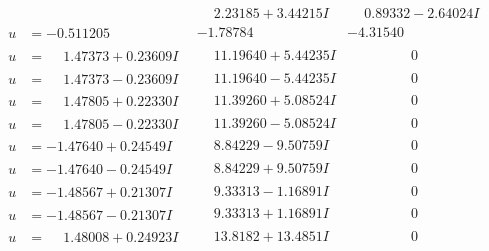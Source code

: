 \documentclass[1p]{elsarticle_modified}
\theoremstyle{definition}
\begin{document}
$$\begin{array}{c|c|c}
 & \phantom{-}2.23185 + 3.44215 I & \phantom{-}0.89332 - 2.64024 I \\ \hline\begin{aligned}
u &= -0.511205\phantom{ +0.000000I}\end{aligned}
 & -1.78784\phantom{ +0.000000I} & -4.31540\phantom{ +0.000000I} \\ \hline\begin{aligned}
u &= \phantom{-}1.47373 + 0.23609 I\end{aligned}
 & \phantom{-}11.19640 + 5.44235 I & \phantom{-0.000000 } 0 \\ \hline\begin{aligned}
u &= \phantom{-}1.47373 - 0.23609 I\end{aligned}
 & \phantom{-}11.19640 - 5.44235 I & \phantom{-0.000000 } 0 \\ \hline\begin{aligned}
u &= \phantom{-}1.47805 + 0.22330 I\end{aligned}
 & \phantom{-}11.39260 + 5.08524 I & \phantom{-0.000000 } 0 \\ \hline\begin{aligned}
u &= \phantom{-}1.47805 - 0.22330 I\end{aligned}
 & \phantom{-}11.39260 - 5.08524 I & \phantom{-0.000000 } 0 \\ \hline\begin{aligned}
u &= -1.47640 + 0.24549 I\end{aligned}
 & \phantom{-}8.84229 - 9.50759 I & \phantom{-0.000000 } 0 \\ \hline\begin{aligned}
u &= -1.47640 - 0.24549 I\end{aligned}
 & \phantom{-}8.84229 + 9.50759 I & \phantom{-0.000000 } 0 \\ \hline\begin{aligned}
u &= -1.48567 + 0.21307 I\end{aligned}
 & \phantom{-}9.33313 - 1.16891 I & \phantom{-0.000000 } 0 \\ \hline\begin{aligned}
u &= -1.48567 - 0.21307 I\end{aligned}
 & \phantom{-}9.33313 + 1.16891 I & \phantom{-0.000000 } 0 \\ \hline\begin{aligned}
u &= \phantom{-}1.48008 + 0.24923 I\end{aligned}
 & \phantom{-}13.8182 + 13.4851 I & \phantom{-0.000000 } 0 \\ \hline\begin{aligned}

\end{aligned}
\end{array}$$
\end{document}
